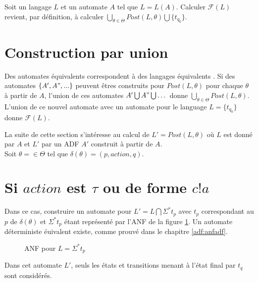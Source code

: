 Soit un langage $L$ et un automate $A$ tel que $L=L(A)$. Calculer $\mathcal{F}(L)$ revient, par définition, à calculer $\bigcup_{\theta\in\Theta}Post(L,\theta)\bigcup \{t_{q_0}\}$.


\section{Construction par union}

Des automates équivalents correspondent à des langages équivalents . Si des automates $\{A', A", ...\}$ peuvent êtres construits pour $Post(L,\theta)$ pour chaque $\theta$ à partir de $A$, l'union de ces automates $A'\bigcup A"\bigcup\dots$ donne $\bigcup_{\theta\in\Theta}Post(L,\theta)$. L'union de ce nouvel automate avec un automate pour le language $L=\{t_{q_0}\}$ donne $\mathcal{F}(L)$.

La suite de cette section s'intéresse au calcul de $L'= Post(L,\theta)$ où $L$ est donné par $A$ et $L'$ par un ADF $A'$ construit à partir de $A$.\\



Soit $\theta=\in\Theta$ tel que $\delta(\theta)=(p,action,q)$.

\section{Si $action$ est $\tau$ ou de forme $c!a$}

Dans ce cas, construire un automate pour $L'=L\bigcap\Sigma^*t_p$ avec $t_p$ correspondant au $p$ de $\delta(\theta)$ et $\Sigma^*t_p$ étant représenté par l'ANF de la figure \ref{fig:sigmatq}. Un automate déterministe éuivalent existe, comme prouvé dans le chapitre \ref{adf:anfadf}.

\begin{figure}[H]
    \centering
    \caption{ANF pour $L=\Sigma^*t_p$}\label{fig:sigmatq}
\end{figure}


Dans cet automate $L'$, seuls les états et transitions menant à l'état final par $t_q$ sont considérés.

